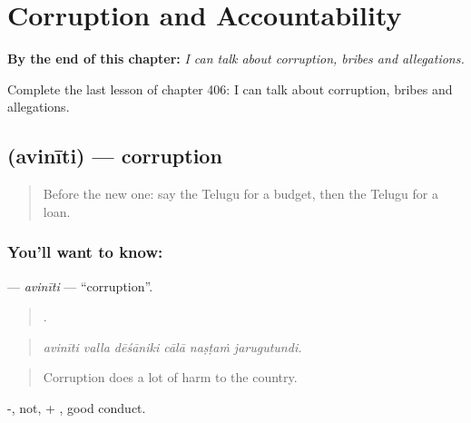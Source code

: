 
\chapter{Corruption and Accountability}
\label{ch:te-corruption-and-accountability}

\begin{chapteropening}
\textbf{By the end of this chapter:} \emph{I can talk about corruption, bribes and allegations.}

Complete the last lesson of chapter 406: I can talk about corruption, bribes and allegations.
\end{chapteropening}

\section[\texorpdfstring{\te{అవినీతి} (avinīti)}{అవినీతి (avinīti)}]{ (avinīti) — corruption}

\label{lesson:TE-C406-aviniti}



\begin{quote}
Before the new one: say the Telugu for a budget, then the Telugu for a loan.
\end{quote}

\subsection*{You'll want to know: }
\textbf{} — \emph{avinīti} — \textquotedblleft{}corruption\textquotedblright{}.

\begin{quote}
     .
\end{quote}

\begin{quote}
\emph{avinīti valla dēśāniki cālā naṣṭaṁ jarugutundi.}
\end{quote}

\begin{quote}
Corruption does a lot of harm to the country.
\end{quote}

-, not, + , good conduct.

